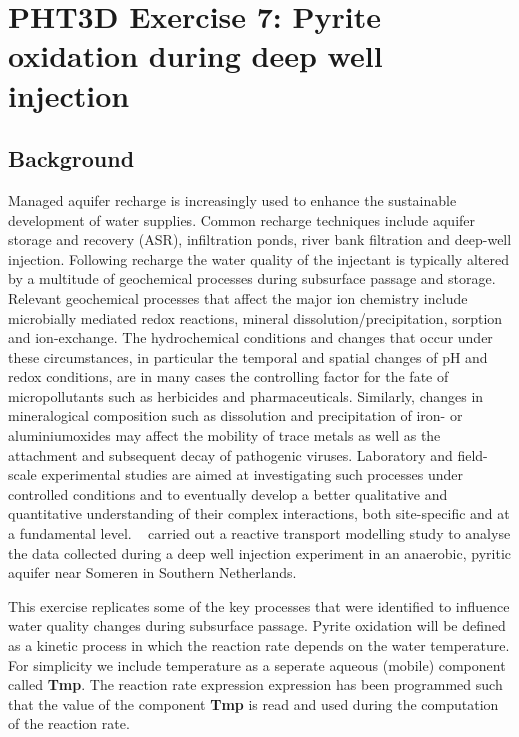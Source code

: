 \newpage
\section[PHT3D Exercise 7: Pyrite oxidation during deep well injection]{PHT3D Exercise 7: Pyrite oxidation during deep well injection}
\subsection[Background]{Background}

Managed aquifer recharge is increasingly used to enhance the sustainable development of water supplies. Common recharge techniques include aquifer storage and recovery (ASR), infiltration ponds, river bank filtration and deep-well injection. Following recharge the water quality of the injectant is typically altered by a multitude of geochemical processes during subsurface passage and storage. Relevant geochemical processes that affect the major ion chemistry include microbially mediated redox reactions, mineral dissolution/precipitation, sorption and ion-exchange. The hydrochemical conditions and changes that occur under these circumstances, in particular the temporal and spatial changes of pH and redox conditions, are in many cases the controlling factor for the fate of micropollutants such as herbicides and pharmaceuticals. Similarly, changes in mineralogical composition such as dissolution and precipitation of iron- or aluminiumoxides may affect the mobility of trace metals as well as the attachment and subsequent decay of pathogenic viruses. Laboratory and field-scale experimental studies are aimed at investigating such processes under controlled conditions and to eventually develop a better qualitative and quantitative understanding of their complex interactions, both site-specific and at a fundamental level. \
\cite{prommer_stuyfzand_2005} carried out a reactive transport 
modelling study to analyse the data collected during a deep well 
injection experiment in an anaerobic, pyritic aquifer near Someren in Southern Netherlands. 

This exercise replicates some of the key processes that were identified
to influence water quality changes during subsurface passage. 
Pyrite oxidation will be defined as a kinetic process in which the
reaction rate depends on the water temperature. 
For simplicity we include temperature as a seperate aqueous (mobile) component
called {\color{red} \textbf{Tmp}}.
The reaction rate expression expression has been programmed such 
that the value of the component {\color{red} \textbf{Tmp}} is read
and used during the computation of the reaction rate. 

